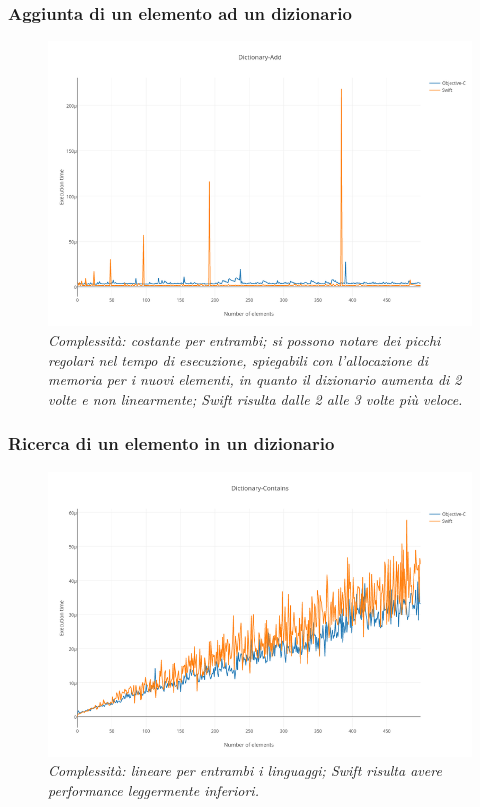 \subsubsection{Aggiunta di un elemento ad un dizionario}
\begin{figure}[H]
      \centering
      \includegraphics[scale=0.50]{immagini/dictionary_add.png}
            \vspace{0.8cm}
            \caption{\textit{Complessità: costante per entrambi; si possono notare dei picchi regolari nel tempo di esecuzione, spiegabili con l'allocazione di memoria per i nuovi elementi, in quanto il dizionario aumenta di 2 volte e non linearmente; Swift risulta dalle 2 alle 3 volte più veloce.}}
\end{figure} 
\subsubsection{Ricerca di un elemento in un dizionario}
\begin{figure}[H]
      \centering
      \includegraphics[scale=0.50]{immagini/dictionary_contains.png}
            \vspace{0.8cm}
            \caption{\textit{Complessità: lineare per entrambi i linguaggi; Swift risulta avere performance leggermente inferiori.}}
\end{figure}
